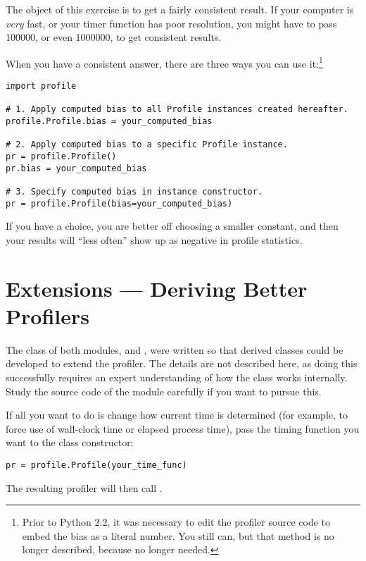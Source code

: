The object of this exercise is to get a fairly consistent result.
If your computer is \emph{very} fast, or your timer function has poor
resolution, you might have to pass 100000, or even 1000000, to get
consistent results.

When you have a consistent answer,
there are three ways you can use it:\footnote{Prior to Python 2.2, it
  was necessary to edit the profiler source code to embed the bias as
  a literal number.  You still can, but that method is no longer
  described, because no longer needed.}

\begin{verbatim}
import profile

# 1. Apply computed bias to all Profile instances created hereafter.
profile.Profile.bias = your_computed_bias

# 2. Apply computed bias to a specific Profile instance.
pr = profile.Profile()
pr.bias = your_computed_bias

# 3. Specify computed bias in instance constructor.
pr = profile.Profile(bias=your_computed_bias)
\end{verbatim}

If you have a choice, you are better off choosing a smaller constant, and
then your results will ``less often'' show up as negative in profile
statistics.


\section{Extensions --- Deriving Better Profilers}

The  class of both modules,  and
, were written so that
derived classes could be developed to extend the profiler.  The details
are not described here, as doing this successfully requires an expert
understanding of how the  class works internally.  Study
the source code of the module carefully if you want to
pursue this.

If all you want to do is change how current time is determined (for
example, to force use of wall-clock time or elapsed process time),
pass the timing function you want to the  class
constructor:

\begin{verbatim}
pr = profile.Profile(your_time_func)
\end{verbatim}

The resulting profiler will then call .

